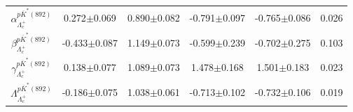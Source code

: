 \begin{table}[h]
{\begin{tabular}{cccccc}
            $\alpha_{\Lambda_c^+}^{p\overline{K}^*(892)}$ & 0.272$\pm$0.069 & 0.890$\pm$0.082 & -0.791$\pm$0.097 & -0.765$\pm$0.086 & 0.026\\
            $\beta_{\Lambda_c^+}^{p\overline{K}^*(892)}$ & -0.433$\pm$0.087 & 1.149$\pm$0.073 & -0.599$\pm$0.239 & -0.702$\pm$0.275 & 0.103\\
            $\gamma_{\Lambda_c^+}^{p\overline{K}^*(892)}$ & 0.138$\pm$0.077 & 1.089$\pm$0.073 & 1.478$\pm$0.168 & 1.501$\pm$0.183 & 0.023\\
            $\Lambda_{\Lambda_c^+}^{p\overline{K}^*(892)}$ & -0.186$\pm$0.075 & 1.038$\pm$0.061 & -0.713$\pm$0.102 & -0.732$\pm$0.106 & 0.019\\
        \hline\hline
        \end{tabular}
        }
\end{table}

